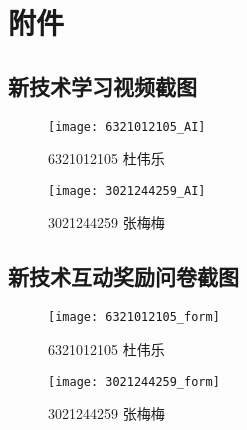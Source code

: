 \chapter{附件}
\section{新技术学习视频截图}
\begin{figure}[htbp]
    \centering
    \texttt{[image: 6321012105\_AI]}
    \caption{6321012105 杜伟乐}\label{fig:6321012105_AI}
    \vspace{\baselineskip}
\end{figure}
\begin{figure}[htbp]
    \centering
    \texttt{[image: 3021244259\_AI]}
    \caption{3021244259 张梅梅}\label{fig:3021244259_AI}
    \vspace{\baselineskip}
\end{figure}


\section{新技术互动奖励问卷截图}
\begin{figure}[htbp]
    \centering
    \begin{minipage}{0.4\textwidth}
        \centering
        \texttt{[image: 6321012105\_form]}
        \caption{6321012105 杜伟乐}\label{fig:6321012105_form}
    \end{minipage}
    \begin{minipage}{0.4\textwidth}
        \centering
        \texttt{[image: 3021244259\_form]}
        \caption{3021244259 张梅梅}\label{fig:3021244259_form}
    \end{minipage}
\end{figure}